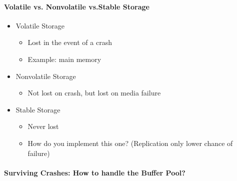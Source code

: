 \paragraph{Volatile vs. Nonvolatile vs.Stable Storage}
\begin{itemize}
\item Volatile Storage
  \begin{itemize}
  \item Lost in the event of a crash
  \item Example: main memory
  \end{itemize}

\item Nonvolatile Storage
  \begin{itemize}
  \item Not lost on crash, but lost on media failure
  \end{itemize}

\item Stable Storage
  \begin{itemize}
  \item Never lost
  \item How do you implement this one? (Replication only lower chance
    of failure)
  \end{itemize}
\end{itemize}

\paragraph{Surviving Crashes: How to handle the Buffer Pool?}


